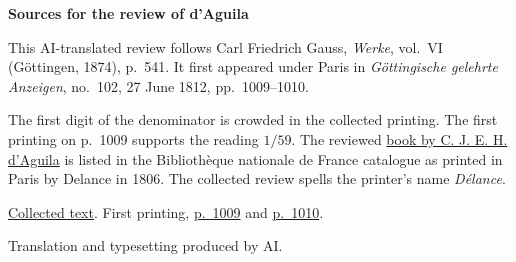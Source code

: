 \clearpage\thispagestyle{empty}
\begin{center}\textbf{Sources for the review of d’Aguila}\end{center}
\noindent This AI-translated review follows Carl Friedrich Gauss, \textit{Werke}, vol.~VI (Göttingen, 1874), p.~541. It first appeared under Paris in \textit{Göttingische gelehrte Anzeigen}, no.~102, 27 June 1812, pp.~1009--1010.
\par\smallskip\noindent The first digit of the denominator is crowded in the collected printing. The first printing on p.~1009 supports the reading \(1/59\). The reviewed \href{https://catalogue.bnf.fr/ark:/12148/cb30005371x}{book by C. J. E. H. d’Aguila} is listed in the Bibliothèque nationale de France catalogue as printed in Paris by Delance in 1806. The collected review spells the printer’s name \textit{Délance}.
\par\smallskip\noindent \href{https://gdz.sub.uni-goettingen.de/id/PPN236007467}{Collected text}. First printing, \href{https://images.sub.uni-goettingen.de/iiif/image/gdz:PPN319721507_1812:00001049/full/full/0/default.jpg}{p.~1009} and \href{https://images.sub.uni-goettingen.de/iiif/image/gdz:PPN319721507_1812:00001050/full/full/0/default.jpg}{p.~1010}.
\par\smallskip\noindent Translation and typesetting produced by AI.
\clearpage
